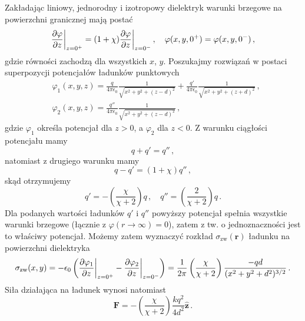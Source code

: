 \documentclass[../main.tex]{subfiles}
\begin{document}
\begin{enumerate}
    Zakładając liniowy, jednorodny i izotropowy dielektryk warunki brzegowe na powierzchni
    granicznej mają postać
    \begin{equation*}
        \pdv{\varphi}{z}\bigg|_{z=0^+}=(1+\chi)\pdv{\varphi}{z}\bigg|_{z=0^-}\,,\quad \varphi(x,y,0^+)=\varphi(x,y,0^-)\,,
    \end{equation*}
    gdzie równości zachodzą dla wszystkich \(x\), \(y\). Poszukajmy rozwiązań w postaci superpozycji
    potencjałów ładunków punktowych
    \begin{equation*}
        \begin{split}
            &\varphi_1(x,y,z)=\frac{q}{4\pi\epsilon_0}\frac{1}{\sqrt{x^2+y^2+(z-d)^2}}+\frac{q'}{4\pi\epsilon_0}\frac{1}{\sqrt{x^2+y^2+(z+d)^2}}\,,\\
            &\varphi_2(x,y,z)=\frac{q''}{4\pi\epsilon_0}\frac{1}{\sqrt{x^2+y^2+(z-d)^2}}\,,
        \end{split}
    \end{equation*}
    gdzie \(\varphi_1\) określa potencjał dla \(z>0\), a \(\varphi_2\) dla \(z<0\). Z warunku
    ciągłości potencjału mamy
    \begin{equation*}
        q+q'=q''\,,
    \end{equation*}
    natomiast z drugiego warunku mamy
    \begin{equation*}
        q-q'=(1+\chi)q''\,,
    \end{equation*}
    skąd otrzymujemy
    \begin{equation*}
        q'=-\left(\frac{\chi}{\chi+2}\right)q\,,\quad q''=\left(\frac{2}{\chi+2}\right)q\,.
    \end{equation*}
    Dla podanych wartości ładunków \(q'\) i \(q''\) powyższy potencjał spełnia wszystkie warunki
    brzegowe (łącznie z \(\varphi(r\to\infty)=0\)), zatem z tw. o jednoznaczności jest to właściwy
    potencjał. Możemy zatem wyznaczyć rozkład \(\sigma_\text{zw}(\mathbf{r})\) ładunku na
    powierzchni dielektryka
    \begin{equation*}
        \sigma_\text{zw}(x,y)=-\epsilon_0\left(\pdv{\varphi_1}{z}\bigg|_{z=0^+}-\pdv{\varphi_2}{z}\bigg|_{z=0^-}\right)=\frac{1}{2\pi}\left(\frac{\chi}{\chi+2}\right)\frac{-qd}{(x^2+y^2+d^2)^{3/2}}\,.
    \end{equation*}
   Siła działająca na ładunek wynosi natomiast
    \begin{equation*}
        \mathbf{F}=-\left(\frac{\chi}{\chi+2}\right)\frac{kq^2}{4d^2}\mathbf{\hat{z}}\,.
    \end{equation*}
    

\end{enumerate}
\end{document}
